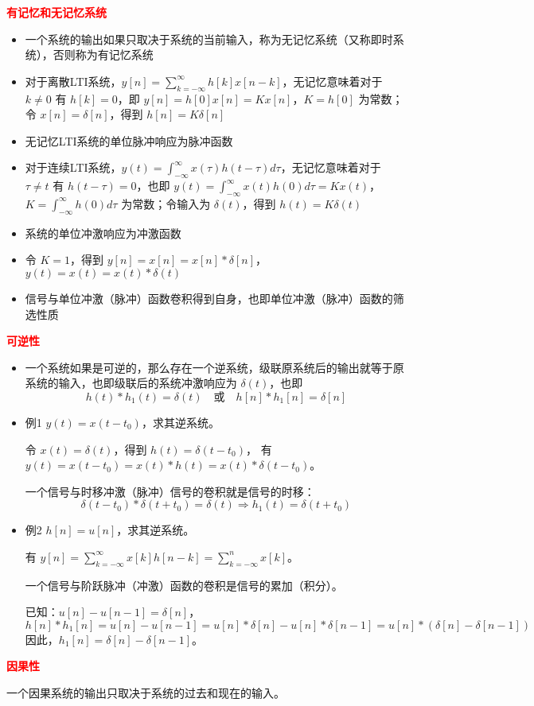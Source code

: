 \documentclass[UTF8]{report}
\theoremstyle{MyLineTheoremStyle} %
\theoremstyle{MyBlockTheoremStyle} %
\theoremstyle{MySubsubsectionStyle} %
\begin{document}
\textbf{\textcolor{red}{有记忆和无记忆系统}}
    \begin{itemize}
        \item 一个系统的输出如果只取决于系统的当前输入，称为无记忆系统（又称即时系统），否则称为有记忆系统
        \item 对于离散LTI系统，$y[n] = \sum_{k=-\infty}^{\infty} h[k] x[n - k]$，无记忆意味着对于 $k \neq 0$ 有 $h[k] = 0$，即 $y[n] = h[0] x[n] = K x[n]$，$K = h[0]$ 为常数；令 $x[n] = \delta[n]$，得到 $h[n] = K \delta[n]$
        \item 无记忆LTI系统的单位脉冲响应为脉冲函数
        \item 对于连续LTI系统，$y(t) = \int_{-\infty}^{\infty} x(\tau) h(t - \tau) d\tau$，无记忆意味着对于 $\tau \neq t$ 有 $h(t - \tau) = 0$，也即 $y(t) = \int_{-\infty}^{\infty} x(t) h(0) d\tau = K x(t)$，$K = \int_{-\infty}^{\infty} h(0) d\tau$ 为常数；令输入为 $\delta(t)$，得到 $h(t) = K \delta(t)$
        \item 系统的单位冲激响应为冲激函数
        \item 令 $K = 1$，得到 $y[n] = x[n] = x[n] * \delta[n]$，$y(t) = x(t) = x(t) * \delta(t)$
        \item 信号与单位冲激（脉冲）函数卷积得到自身，也即单位冲激（脉冲）函数的筛选性质
    \end{itemize}
\vspace{1em}
    \textbf{\textcolor{red}{可逆性}}
    \begin{itemize}
        \item 一个系统如果是可逆的，那么存在一个逆系统，级联原系统后的输出就等于原系统的输入，也即级联后的系统冲激响应为 $\delta(t)$，也即
    \[
    h(t) * h_1(t) = \delta(t) \quad \text{或} \quad h[n] * h_1[n] = \delta[n]
    \]
    
        \item 例1
    $y(t) = x(t - t_0)$，求其逆系统。
    
    令 $x(t) = \delta(t)$，得到 $h(t) = \delta(t - t_0)$，
    有 $y(t) = x(t - t_0) = x(t) * h(t) = x(t) * \delta(t - t_0)$。
    
    一个信号与时移冲激（脉冲）信号的卷积就是信号的时移：
    \[
    \delta(t - t_0) * \delta(t + t_0) = \delta(t) \Rightarrow h_1(t) = \delta(t + t_0)
    \]
    
        \item 例2
    $h[n] = u[n]$，求其逆系统。
    
    有 $y[n] = \sum_{k=-\infty}^{\infty} x[k] h[n - k] = \sum_{k=-\infty}^{n} x[k]$。
    
    一个信号与阶跃脉冲（冲激）函数的卷积是信号的累加（积分）。
    
    已知：$u[n] - u[n - 1] = \delta[n]$，
    \[
    h[n] * h_1[n] = u[n] - u[n - 1] = u[n] * \delta[n] - u[n] * \delta[n - 1] = u[n] * (\delta[n] - \delta[n - 1])
    \]
    因此，$h_1[n] = \delta[n] - \delta[n - 1]$。
    \end{itemize}
\vspace{1em}
    \textbf{\textcolor{red}{因果性}}\par
    一个因果系统的输出只取决于系统的过去和现在的输入。
    
\end{document}
